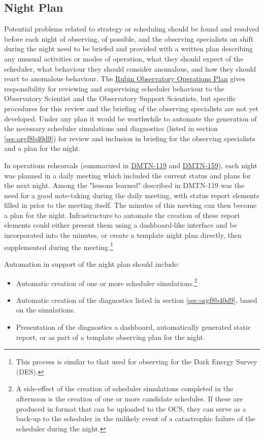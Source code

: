 \subsection{Night Plan}
\label{sec:org17b361d}

Potential problems related to strategy or scheduling should be found and resolved before each night of observing, of possible, and the observing specialists on shift during the night need to be briefed and provided with a written plan describing any unusual activities or modes of operation, what they should expect of the scheduler, what behaviour they should consider anomalous, and how they should react to anomalous behaviour.
The \href{https://docushare.lsst.org/docushare/dsweb/Get/Document-36797/Rubin\%20Observatory\%20Operations\%20Plan\%20April\%202020.pdf}{Rubin Observatory Operations Plan} gives responsibility for reviewing and supervising scheduler behaviour to the Observatory Scientist and the Observatory Support Scientists, but specific procedures for this review and the briefing of the observing specialists are not yet developed.
Under any plan it would be worthwhile to automate the generation of the necessary scheduler simulations and diagnostics (listed in section \ref{sec:orgf8b40d9}) for review and inclusion in briefing for the observing specialists and a plan for the night.

In operations rehearsals (summarized in \href{https://dmtn-119.lsst.io}{DMTN-119} and \href{https://dmtn-159.lsst.io/}{DMTN-159}), each night was planned in a daily meeting which included the current status and plans for the next night.
Among the "lessons learned" described in DMTN-119 was the need for a good note-taking during the daily meeting, with status report elements filled in prior to the meeting itself. 
The minutes of this meeting can then become a plan for the night.
Infrastructure to automate the creation of these report elements could either present them using a dashboard-like interface and be incorporated into the minutes, or create a template night plan directly, then supplemented during the meeting.\footnote{This process is similar to that used for observing for the Dark Energy Survey (DES).}

Automation in support of the night plan should include:
\begin{itemize}
\item Automatic creation of one or more scheduler simulations.\footnote{A side-effect of the creation of scheduler simulations completed in the afternoon is the creation of one or more candidate schedules. If these are produced in format that can be uploaded to the OCS, they can serve as a back-up to the scheduler in the unlikely event of a catastrophic failure of the scheduler during the night.}
\item Automatic creation of the diagnostics listed in section \ref{sec:orgf8b40d9}, based on the simulations.
\item Presentation of the diagnostics a dashboard, automatically generated static report, or as part of a template observing plan for the night.
\end{itemize}

